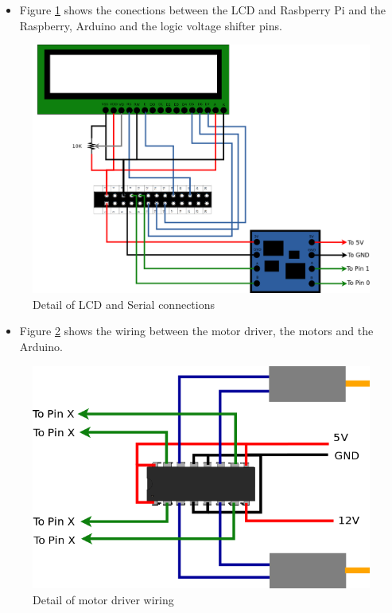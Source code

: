 	\begin{itemize}
	\item Figure \ref{gpioDetail} shows the conections between the LCD and Rasbperry Pi and the Raspberry, Arduino and the logic voltage shifter pins.
	\end{itemize}

	\begin{figure}[H]
			\centering
			\includegraphics[width=15cm, angle=0]{images/Diagrams/detail.png}
			\caption{Detail of LCD and Serial connections }
			\label{gpioDetail}
	\end{figure}
	\bigskip


	\bigskip
	\begin{itemize}
	\item Figure \ref{hbridgeDetail} shows the wiring between the motor driver, the motors and the Arduino.
	\end{itemize}
	
	\begin{figure}[H]
			\centering
			\includegraphics[scale=0.5, angle=0]{images/Diagrams/hbridge.png}
			\caption{Detail of motor driver wiring }
			\label{hbridgeDetail}
	\end{figure}
	\bigskip

